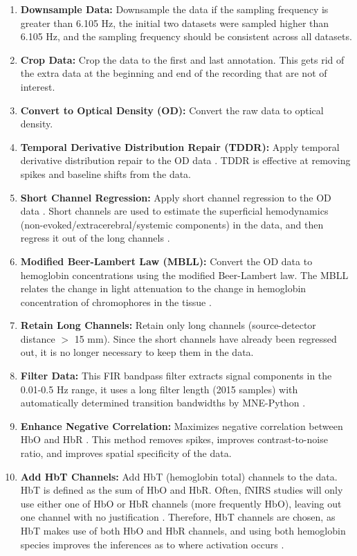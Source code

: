 \begin{enumerate}
    \item \textbf{Downsample Data:} Downsample the data if the sampling frequency is greater than 6.105 Hz, the initial two datasets were sampled higher than 6.105 Hz, and the sampling frequency should be consistent across all datasets.
    \item \textbf{Crop Data:} Crop the data to the first and last annotation. This gets rid of the extra data at the beginning and end of the recording that are not of interest.
    \item \textbf{Convert to Optical Density (OD):} Convert the raw data to optical density.
    \item \textbf{Temporal Derivative Distribution Repair (TDDR):} Apply temporal derivative distribution repair to the OD data \citep{fishburn_temporal_2019}. TDDR is effective at removing spikes and baseline shifts from the data. 
    \item \textbf{Short Channel Regression:} Apply short channel regression to the OD data \citep{scholkmann_measuring_2014}. Short channels are used to estimate the superficial hemodynamics (non-evoked/extracerebral/systemic components) in the data, and then regress it out of the long channels \citep{tachtsidis_false_2016}. 
    \item \textbf{Modified Beer-Lambert Law (MBLL):} Convert the OD data to hemoglobin concentrations using the modified Beer-Lambert law. The MBLL relates the change in light attenuation to the change in hemoglobin concentration of chromophores in the tissue \citep{kocsis_modified_2006}.
    \item \textbf{Retain Long Channels:} Retain only long channels (source-detector distance $>$ 15 mm). Since the short channels have already been regressed out, it is no longer necessary to keep them in the data.
    \item \textbf{Filter Data:} This FIR bandpass filter extracts signal components in the 0.01-0.5 Hz range, it uses a long filter length (2015 samples) with automatically determined transition bandwidths by MNE-Python \citep{pinti_current_2019}. 
    \item \textbf{Enhance Negative Correlation:} Maximizes negative correlation between HbO and HbR \citep{cui_functional_2010}. This method removes spikes, improves contrast-to-noise ratio, and improves spatial specificity of the data.
    \item \textbf{Add HbT Channels:} Add HbT (hemoglobin total) channels to the data. HbT is defined as the sum of HbO and HbR. Often, fNIRS studies will only use either one of HbO or HbR channels (more frequently HbO), leaving out one channel with no justification \citep{kinder_systematic_2022}. Therefore, HbT channels are chosen, as HbT makes use of both HbO and HbR channels, and using both hemoglobin species improves the inferences as to where activation occurs \cite{hocke_automated_2018}.
\end{enumerate}

